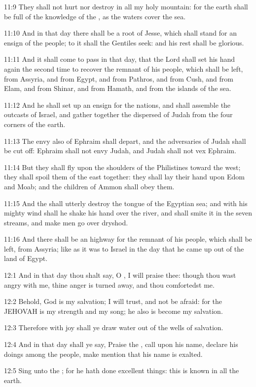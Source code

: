11:9 They shall not hurt nor destroy in all my holy mountain: for the earth shall be full of the knowledge of the \LORD, as the waters cover the sea.

11:10 And in that day there shall be a root of Jesse, which shall stand for an ensign of the people; to it shall the Gentiles seek: and his rest shall be glorious.

11:11 And it shall come to pass in that day, that the Lord shall set his hand again the second time to recover the remnant of his people, which shall be left, from Assyria, and from Egypt, and from Pathros, and from Cush, and from Elam, and from Shinar, and from Hamath, and from the islands of the sea.

11:12 And he shall set up an ensign for the nations, and shall assemble the outcasts of Israel, and gather together the dispersed of Judah from the four corners of the earth.

11:13 The envy also of Ephraim shall depart, and the adversaries of Judah shall be cut off: Ephraim shall not envy Judah, and Judah shall not vex Ephraim.

11:14 But they shall fly upon the shoulders of the Philistines toward the west; they shall spoil them of the east together: they shall lay their hand upon Edom and Moab; and the children of Ammon shall obey them.

11:15 And the \LORD shall utterly destroy the tongue of the Egyptian sea; and with his mighty wind shall he shake his hand over the river, and shall smite it in the seven streams, and make men go over dryshod.

11:16 And there shall be an highway for the remnant of his people, which shall be left, from Assyria; like as it was to Israel in the day that he came up out of the land of Egypt.

12:1 And in that day thou shalt say, O \LORD, I will praise thee: though thou wast angry with me, thine anger is turned away, and thou comfortedst me.

12:2 Behold, God is my salvation; I will trust, and not be afraid: for the \LORD JEHOVAH is my strength and my song; he also is become my salvation.

12:3 Therefore with joy shall ye draw water out of the wells of salvation.

12:4 And in that day shall ye say, Praise the \LORD, call upon his name, declare his doings among the people, make mention that his name is exalted.

12:5 Sing unto the \LORD; for he hath done excellent things: this is known in all the earth.

